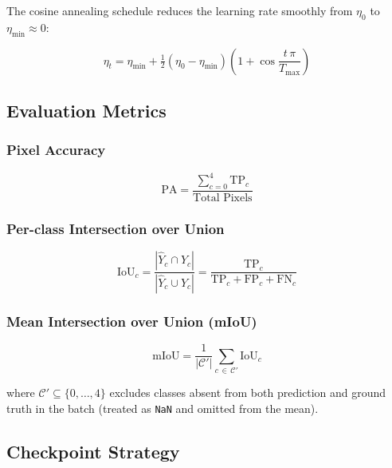 \documentclass[12pt, a4paper]{article}
\begin{document}
The cosine annealing schedule reduces the learning rate smoothly from $\eta_0$ to $\eta_{\min} \approx 0$:

\begin{equation}
  \eta_t = \eta_{\min} + \tfrac{1}{2}\left(\eta_0 - \eta_{\min}\right)
    \left(1 + \cos\!\frac{t\,\pi}{T_{\max}}\right)
\end{equation}

\subsection{Evaluation Metrics}

\subsubsection{Pixel Accuracy}

\begin{equation}
  \text{PA} = \frac{\displaystyle\sum_{c=0}^{4} \mathrm{TP}_c}
                   {\text{Total Pixels}}
\end{equation}

\subsubsection{Per-class Intersection over Union}

\begin{equation}
  \mathrm{IoU}_c =
  \frac{|\hat{Y}_c \cap Y_c|}{|\hat{Y}_c \cup Y_c|}
  = \frac{\mathrm{TP}_c}{\mathrm{TP}_c + \mathrm{FP}_c + \mathrm{FN}_c}
\end{equation}

\subsubsection{Mean Intersection over Union (mIoU)}

\begin{equation}
  \mathrm{mIoU} = \frac{1}{|\mathcal{C}'|}
    \sum_{c \,\in\, \mathcal{C}'} \mathrm{IoU}_c
\end{equation}

where $\mathcal{C}' \subseteq \{0,\ldots,4\}$ excludes classes absent from both prediction and ground truth in the batch (treated as \texttt{NaN} and omitted from the mean).

\subsection{Checkpoint Strategy}
\end{document}
